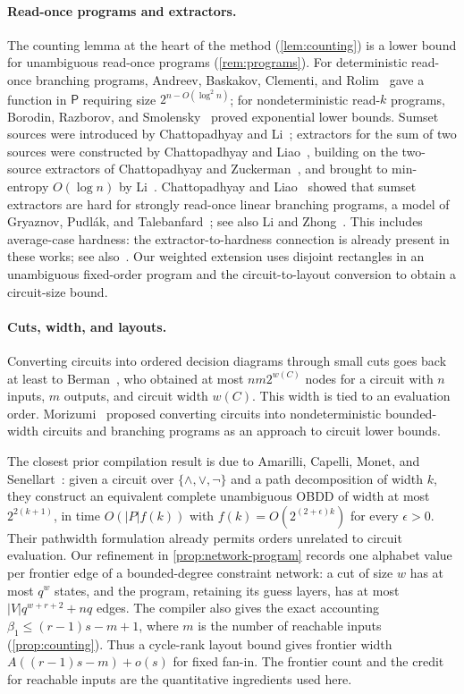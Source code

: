 \documentclass[11pt]{article}
\theoremstyle{plain}
\theoremstyle{definition}
\theoremstyle{remark}
\newcommand{\card}[1]{\lvert #1\rvert}
\begin{document}
\paragraph{Read-once programs and extractors.}
The counting lemma at the heart of the method (\cref{lem:counting}) is a lower bound for
unambiguous read-once programs (\cref{rem:programs}). For deterministic read-once branching
programs, Andreev, Baskakov, Clementi, and Rolim~\cite{ABCR1999} gave a function in $\mathsf P$
requiring size $2^{n - O(\log^2 n)}$; for nondeterministic read-$k$ programs, Borodin, Razborov,
and Smolensky~\cite{BRS1993} proved exponential lower bounds. Sumset sources were introduced by
Chattopadhyay and Li~\cite{ChattopadhyayLi2016}; extractors for the sum of two sources were
constructed by Chattopadhyay and Liao~\cite{ChattopadhyayLiao2022}, building on the two-source
extractors of Chattopadhyay and Zuckerman~\cite{ChattopadhyayZuckerman2019}, and brought to
min-entropy $O(\log n)$ by Li~\cite{Li2023}. Chattopadhyay and Liao~\cite{ChattopadhyayLiao2023}
showed that sumset extractors are hard for strongly read-once linear branching programs, a model
of Gryaznov, Pudl{\'a}k, and Talebanfard~\cite{GPT2022}; see also Li and
Zhong~\cite{LiZhong2024}. This includes average-case hardness: the extractor-to-hardness
connection is already present in these works; see also~\cite[Theorem~7.27]{Li2023}.
Our weighted extension uses disjoint rectangles in an unambiguous fixed-order program
and the circuit-to-layout conversion to obtain a circuit-size bound.

\paragraph{Cuts, width, and layouts.}
Converting circuits into ordered decision diagrams through small cuts goes back at least to
Berman~\cite{Berman1991}, who obtained at most $nm2^{w(C)}$ nodes for a circuit with $n$ inputs,
$m$ outputs, and circuit width $w(C)$. This width is tied to an evaluation order.
Morizumi~\cite{Morizumi2023} proposed converting circuits into nondeterministic bounded-width
circuits and branching programs as an approach to circuit lower bounds.

The closest prior compilation result is due to Amarilli, Capelli, Monet, and
Senellart~\cite[Theorem~4.4]{ACMS2019}: given a circuit over $\{\land,\lor,\neg\}$ and a path
decomposition of width $k$, they construct an equivalent complete unambiguous OBDD of width at most
$2^{2(k+1)}$, in time $O(|P|f(k))$ with $f(k)=O(2^{(2+\epsilon)k})$ for every $\epsilon>0$.
Their pathwidth formulation already permits orders unrelated to circuit evaluation.
Our refinement in \cref{prop:network-program} records one alphabet value per frontier edge
of a bounded-degree constraint network: a cut of size $w$ has at most $q^w$ states, and the
program, retaining its guess layers, has at most $\card V q^{w+r+2}+nq$ edges.
The compiler also gives the exact accounting
$\beta_1\le(r-1)s-m+1$, where $m$ is the number of reachable inputs
(\cref{prop:counting}). Thus a cycle-rank layout bound gives frontier width
$A((r-1)s-m)+o(s)$ for fixed fan-in. The frontier count and the credit for
reachable inputs are the quantitative ingredients used here.
\end{document}
